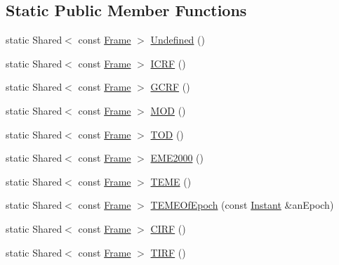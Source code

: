 \subsection*{Static Public Member Functions}
\begin{DoxyCompactItemize}
\item 
static Shared$<$ const \hyperlink{classostk_1_1physics_1_1coord_1_1_frame}{Frame} $>$ \hyperlink{classostk_1_1physics_1_1coord_1_1_frame_a292d32b849648a8e530d35ac47b5c699}{Undefined} ()
\item 
static Shared$<$ const \hyperlink{classostk_1_1physics_1_1coord_1_1_frame}{Frame} $>$ \hyperlink{classostk_1_1physics_1_1coord_1_1_frame_af111d96da6adf5405a354a769618b5f4}{I\+C\+RF} ()
\item 
static Shared$<$ const \hyperlink{classostk_1_1physics_1_1coord_1_1_frame}{Frame} $>$ \hyperlink{classostk_1_1physics_1_1coord_1_1_frame_abe31c60e3e7f654b101876cb6b9b5238}{G\+C\+RF} ()
\item 
static Shared$<$ const \hyperlink{classostk_1_1physics_1_1coord_1_1_frame}{Frame} $>$ \hyperlink{classostk_1_1physics_1_1coord_1_1_frame_a9859be897a20a6bade92d50ff2160115}{M\+OD} ()
\item 
static Shared$<$ const \hyperlink{classostk_1_1physics_1_1coord_1_1_frame}{Frame} $>$ \hyperlink{classostk_1_1physics_1_1coord_1_1_frame_a93b8afe72e11b84187a2aafe1b04011a}{T\+OD} ()
\item 
static Shared$<$ const \hyperlink{classostk_1_1physics_1_1coord_1_1_frame}{Frame} $>$ \hyperlink{classostk_1_1physics_1_1coord_1_1_frame_a61b7c68b761966956251d393bf57f5e5}{E\+M\+E2000} ()
\item 
static Shared$<$ const \hyperlink{classostk_1_1physics_1_1coord_1_1_frame}{Frame} $>$ \hyperlink{classostk_1_1physics_1_1coord_1_1_frame_a1441cef9cd2abe312753f3a81606adfb}{T\+E\+ME} ()
\item 
static Shared$<$ const \hyperlink{classostk_1_1physics_1_1coord_1_1_frame}{Frame} $>$ \hyperlink{classostk_1_1physics_1_1coord_1_1_frame_ab47046bc517b04537c96844d95c13fdd}{T\+E\+M\+E\+Of\+Epoch} (const \hyperlink{classostk_1_1physics_1_1time_1_1_instant}{Instant} \&an\+Epoch)
\item 
static Shared$<$ const \hyperlink{classostk_1_1physics_1_1coord_1_1_frame}{Frame} $>$ \hyperlink{classostk_1_1physics_1_1coord_1_1_frame_ae858400dfa432f12b71712b52b3f5108}{C\+I\+RF} ()
\item 
static Shared$<$ const \hyperlink{classostk_1_1physics_1_1coord_1_1_frame}{Frame} $>$ \hyperlink{classostk_1_1physics_1_1coord_1_1_frame_ac159b1d21bc5f55e7163d27f4cc25c34}{T\+I\+RF} ()

\end{DoxyCompactItemize}
